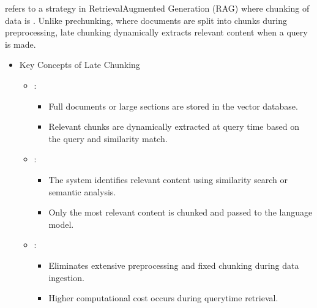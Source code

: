 \documentclass[letterpaper,11pt,english]{sphinxmanual}
\begin{document}
\sphinxAtStartPar
{} refers to a strategy in Retrieval\sphinxhyphen{}Augmented Generation (RAG) where chunking of
data is . Unlike pre\sphinxhyphen{}chunking, where documents are split into chunks
during preprocessing, late chunking dynamically extracts relevant content when a query is made.
\begin{itemize}
\item {} 
\sphinxAtStartPar
Key Concepts of Late Chunking
\begin{itemize}
\item {} 
\sphinxAtStartPar
{}:
\begin{itemize}
\item {} 
\sphinxAtStartPar
Full documents or large sections are stored in the vector database.

\item {} 
\sphinxAtStartPar
Relevant chunks are dynamically extracted at query time based on the query and similarity match.

\end{itemize}

\item {} 
\sphinxAtStartPar
{}:
\begin{itemize}
\item {} 
\sphinxAtStartPar
The system identifies relevant content using similarity search or semantic analysis.

\item {} 
\sphinxAtStartPar
Only the most relevant content is chunked and passed to the language model.

\end{itemize}

\item {} 
\sphinxAtStartPar
{}:
\begin{itemize}
\item {} 
\sphinxAtStartPar
Eliminates extensive preprocessing and fixed chunking during data ingestion.

\item {} 
\sphinxAtStartPar
Higher computational cost occurs during query\sphinxhyphen{}time retrieval.

\end{itemize}

\end{itemize}

\end{itemize}
\end{document}
